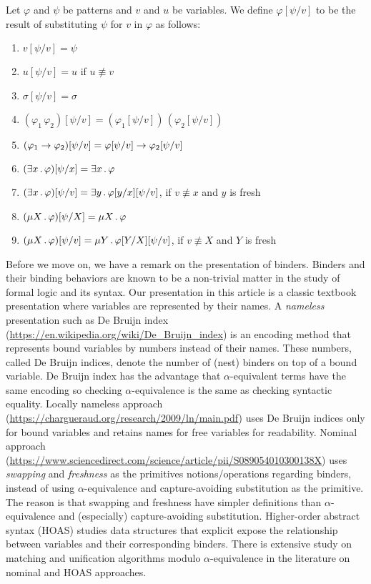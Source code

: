 \documentclass{article}
\begin{document}
\begin{definition}
\label{def:substitutions}
Let $\varphi$ and $\psi$ be patterns and $v$ and $u$ be variables.
We define $\varphi[\psi/v]$ to be the result of substituting
$\psi$ for $v$ in $\varphi$ as follows:
\begin{enumerate}
\item $v[\psi/v] = \psi$
\item $u[\psi/v] = u$ if $u \not\equiv v$
\item $\sigma[\psi/v] = \sigma$
\item $(\varphi_1 \, \varphi_2)[\psi/v]
       = (\varphi_1[\psi/v]) \, (\varphi_2[\psi/v])$
\item $(\varphi_1 \to \varphi_2)[\psi/v]
       =\varphi[\psi/v] \to \varphi_2[\psi/v]$
\item $(\exists x \,.\, \varphi)[\psi/x] = \exists x \,.\, \varphi$
\item $(\exists x \,.\, \varphi)[\psi/v] = \exists y \,.\, \varphi[y/x][\psi/v]$,
      if $v \not\equiv x$ and $y$ is fresh
\item $(\mu X \,.\, \varphi)[\psi/X] = \mu X \,.\, \varphi$
\item $(\mu X \,.\, \varphi)[\psi/v] = \mu Y \,.\, \varphi[Y/X][\psi/v]$,
      if $v \not\equiv X$ and $Y$ is fresh
\end{enumerate}
\end{definition}

Before we move on, we have a remark on the presentation of binders.
Binders and their binding behaviors are known to be a non-trivial matter
in the study of formal logic and its syntax.
Our presentation in this article
is a classic textbook presentation
where variables are represented by their names.
A \emph{nameless} presentation such as De Bruijn index
(\url{https://en.wikipedia.org/wiki/De_Bruijn_index})
is an encoding method that represents bound variables by numbers instead of their names.
These numbers, called De Bruijn indices, denote the number of (nest) binders
on top of a bound variable.
De Bruijn index has the advantage that $\alpha$-equivalent terms
have the same encoding
so checking $\alpha$-equivalence is the same as checking syntactic equality.
Locally nameless approach
(\url{https://chargueraud.org/research/2009/ln/main.pdf})
uses De Bruijn indices only for bound variables
and retains names for free variables for readability.
Nominal approach (\url{https://www.sciencedirect.com/science/article/pii/S089054010300138X})
uses \emph{swapping} and \emph{freshness} as the primitives notions/operations
regarding binders, instead of using
$\alpha$-equivalence and capture-avoiding substitution as the primitive.
The reason is that swapping and freshness have simpler definitions
than $\alpha$-equivalence and (especially) capture-avoiding substitution.
Higher-order abstract syntax (HOAS) studies data structures
that explicit expose the relationship between variables and their corresponding binders.
There is extensive study on matching and unification algorithms
modulo $\alpha$-equivalence in the literature on
nominal and HOAS approaches.
\end{document}
